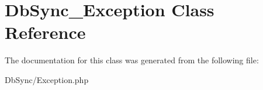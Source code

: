 \hypertarget{classDbSync__Exception}{
\section{DbSync\_\-Exception Class Reference}
\label{classDbSync__Exception}
}


The documentation for this class was generated from the following file:\begin{DoxyCompactItemize}
\item 
DbSync/Exception.php\end{DoxyCompactItemize}
